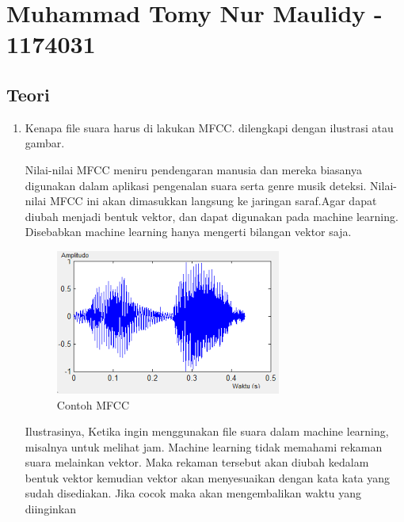 \section{Muhammad Tomy Nur Maulidy - 1174031}
\subsection{Teori}
\begin{enumerate}
\item Kenapa file suara harus di lakukan MFCC. dilengkapi dengan ilustrasi atau gambar. \\
\par Nilai-nilai MFCC meniru pendengaran manusia dan mereka biasanya digunakan dalam aplikasi pengenalan suara serta genre musik
deteksi. Nilai-nilai MFCC ini akan dimasukkan langsung ke jaringan saraf.Agar dapat diubah menjadi bentuk vektor, dan dapat digunakan pada machine learning. Disebabkan machine learning hanya mengerti bilangan vektor saja.\\
\begin{figure}[ht]
\centering
\includegraphics[scale=0.5]{figures/1174031/6/7.png}
\caption{Contoh MFCC}
\label{Teori}
\end{figure}
Ilustrasinya, Ketika ingin menggunakan file suara dalam machine learning, misalnya untuk melihat jam. Machine learning tidak memahami rekaman suara melainkan vektor. Maka rekaman tersebut akan diubah kedalam bentuk vektor kemudian vektor akan menyesuaikan dengan kata kata yang sudah disediakan. Jika cocok maka akan mengembalikan waktu yang diinginkan


\end{enumerate}
